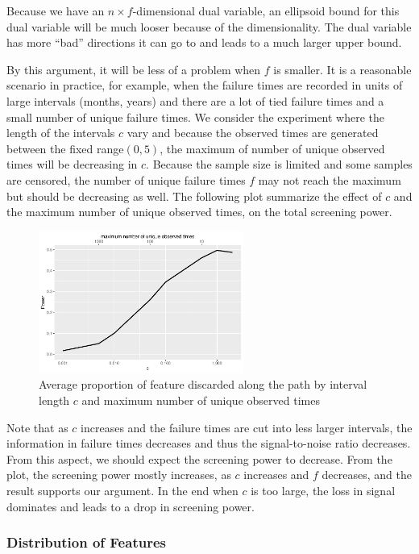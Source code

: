 Because we have an $n\times f$-dimensional dual variable, an ellipsoid bound for this dual variable will be much looser because of the dimensionality. The dual variable has more ``bad'' directions it can go to and leads to a much larger upper bound.

By this argument, it will be less of a problem when $f$ is smaller. It is a reasonable scenario in practice, for example, when the failure times are recorded in units of large intervals (months, years) and there are a lot of tied failure times and a small number of unique failure times. We consider the experiment where the length of the intervals $c$ vary and because the observed times are generated between the fixed range$(0,5)$, the maximum of number of unique observed times will be decreasing in $c$. Because the sample size is limited and some samples are censored, the number of unique failure times $f$ may not reach the maximum but should be decreasing as well. The following plot summarize the effect of $c$ and the maximum number of unique observed times, on the total screening power.

\begin{figure}[ht]
    \centering
    \includegraphics[width=0.6\textwidth]{interval.pdf}
    \caption{Average proportion of feature discarded along the path by interval length $c$ and maximum number of unique observed times}
\end{figure}

Note that as $c$ increases and the failure times are cut into less larger intervals, the information in failure times decreases and thus the signal-to-noise ratio decreases. From this aspect, we should expect the screening power to decrease. From the plot, the screening power mostly increases, as $c$ increases and $f$ decreases, and the result supports our argument. In the end when $c$ is too large, the loss in signal dominates and leads to a drop in screening power.

\subsubsection{Distribution of Features}

